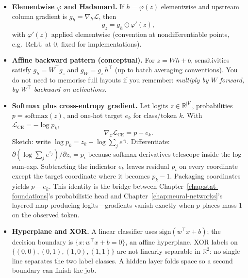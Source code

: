 \begin{itemize}[leftmargin=1.5em]
  Take scalar \(\mathcal{L}(z)\) with \(z\in\mathbb{R}^m\) depending on \(\theta\in\mathbb{R}^r\). With \emph{column} gradients \(g_z=\nabla_z \mathcal{L}\in\mathbb{R}^m\) and \(g_\theta=\nabla_\theta\mathcal{L}\in\mathbb{R}^r\),
  \[
    g_\theta = \Bigl(\frac{\partial z}{\partial \theta}\Bigr)^{\!\top} g_z,
  \]
  where \(\partial z/\partial \theta\) has shape \(m\times r\) (row \(i\): \(\partial z_i/\partial \theta\)). Each layer implements one structured Jacobian--vector product; backprop is the reverse topological walk applying those products without forming full Jacobians explicitly.

  \item \textbf{Elementwise \(\varphi\) and Hadamard.}
  If \(h=\varphi(z)\) elementwise and upstream column gradient is \(g_h=\nabla_h \mathcal{L}\), then
  \[
    g_z = g_h \odot \varphi'(z),
  \]
  with \(\varphi'(z)\) applied elementwise (convention at nondifferentiable points, e.g.\ ReLU at \(0\), fixed for implementations).

  \item \textbf{Affine backward pattern (conceptual).}
  For \(z = W h + b\), sensitivities satisfy \(g_h = W^{\top} g_z\) and \(g_W = g_z\, h^{\top}\) (up to batch averaging conventions). You do not need to memorise full layouts if you remember: \emph{multiply by \(W\) forward, by \(W^{\top}\) backward on activations}.

  \item \textbf{Softmax plus cross-entropy gradient.}
  Let logits \(z\in\mathbb{R}^{|V|}\), probabilities \(p=\mathrm{softmax}(z)\), and one-hot target \(e_k\) for class/token \(k\). With \(\mathcal{L}_{\mathrm{CE}}=-\log p_k\),
  \[
    \nabla_z \mathcal{L}_{\mathrm{CE}} = p - e_k.
  \]
  Sketch: write \(\log p_k = z_k - \log\sum_j e^{z_j}\). Differentiate: \(\partial (\log\sum_j e^{z_j})/\partial z_i = p_i\) because softmax derivatives telescope inside the log-sum-exp. Subtracting the indicator \(e_k\) leaves residual \(p_i\) on every coordinate except the target coordinate where it becomes \(p_k-1\). Packaging coordinates yields \(p-e_k\). This identity is the bridge between Chapter~\ref{chap:stat-foundations}'s probabilistic head and Chapter~\ref{chap:neural-networks}'s layered map producing logits---gradients vanish exactly when \(p\) places mass \(1\) on the observed token.

  \item \textbf{Hyperplane and XOR.}
  A linear classifier uses \(\mathrm{sign}(w^{\top}x+b)\); the decision boundary is \(\{x:w^{\top}x+b=0\}\), an affine hyperplane. XOR labels on \(\{(0,0),(0,1),(1,0),(1,1)\}\) are not linearly separable in \(\mathbb{R}^2\): no single line separates the two label classes. A hidden layer folds space so a second boundary can finish the job.


\end{itemize}
